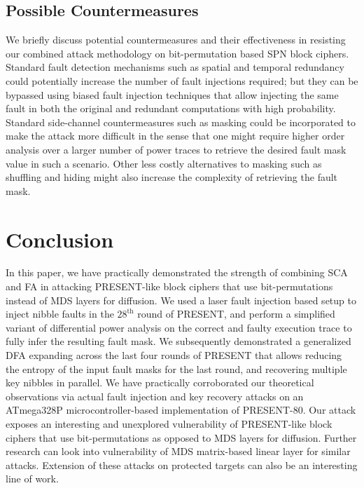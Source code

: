\documentclass[10pt, conference, compsocconf]{IEEEtran}  %
\numberwithin{Definition}{section}
\numberwithin{Claim}{section}
\begin{document}
\subsection{Possible Countermeasures}

We briefly discuss potential countermeasures and their effectiveness in resisting our combined attack methodology on bit-permutation based SPN block ciphers. Standard fault detection mechanisms such as spatial and temporal redundancy could potentially increase the number of fault injections required; but they can be bypassed using biased fault injection techniques \cite{patranabis2015biased} that allow injecting the same fault in both the original and redundant computations with high probability. Standard side-channel countermeasures such as masking could be incorporated to make the attack more difficult in the sense that one might require higher order analysis over a larger number of power traces to retrieve the desired fault mask value in such a scenario. Other less costly alternatives to masking such as shuffling and hiding might also increase the complexity of retrieving the fault mask. 




\section{Conclusion}

In this paper, we have practically demonstrated the strength of combining SCA and FA in attacking PRESENT-like block ciphers that use bit-permutations instead of MDS layers for diffusion. We used a laser fault injection based setup to inject nibble faults in the ${28}^{\text{th}}$ round of PRESENT, and perform a simplified variant of differential power analysis on the correct and faulty execution trace to fully infer the resulting fault mask. We subsequently demonstrated a generalized DFA expanding across the last four rounds of PRESENT that allows reducing the entropy of the input fault masks for the last round, and recovering multiple key nibbles in parallel. We have practically corroborated our theoretical observations via actual fault injection and key recovery attacks on an ATmega328P microcontroller-based implementation of PRESENT-80. Our attack exposes an interesting and unexplored vulnerability of PRESENT-like block ciphers that use bit-permutations as opposed to MDS layers for diffusion. Further research can look into vulnerability of MDS matrix-based linear layer for similar attacks. Extension of these attacks on protected targets can also be an interesting line of work.





\end{document}
